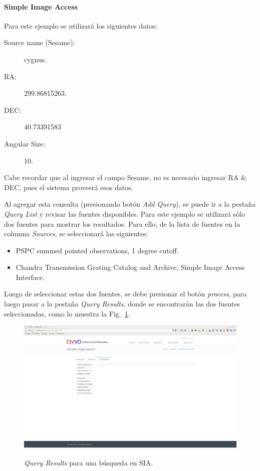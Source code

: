 \paragraph{Simple Image Access}

Para este ejemplo se utilizará los siguientes datos:

\begin{description}
  \item [Source name (Sesame):] cygnus.
  \item [RA:] 299.86815263.
  \item [DEC:] 40.73391583
  \item [Angular Size:] 10.
\end{description}

Cabe recordar que al ingresar el campo Sesame, no es necesario
ingresar RA \& DEC, pues el sistema proveerá esos datos.

Al agregar esta consulta (presionando botón \emph{Add Query}), se puede
ir a la pestaña \emph{Query List} y revisar las fuentes disponibles.
Para este ejemplo se utilizará sólo dos fuentes para mostrar los
resultados. Para ello, de la lista de fuentes en la columna
\emph{Sources}, se seleccionará las siguientes:

\begin{itemize}
  \item PSPC summed pointed observations, 1 degree cutoff.
  \item Chandra Transmission Grating Catalog and Archive, Simple Image
    Access Interface.
\end{itemize}

Luego de seleccionar estas dos fuentes, se debe presionar el botón
\emph{process}, para luego pasar a la pestaña \emph{Query Results},
donde se encontrarán las dos fuentes seleccionadas, como lo muestra la
Fig.~\ref{img:qrsia}.

\begin{figure}[ht!]
    \begin{center}
	\includegraphics[scale=.2]{img/qrsia}
    \end{center}
    \caption{\emph{Query Results} para una búsqueda en SIA.}
    \label{img:qrsia}
\end{figure}

